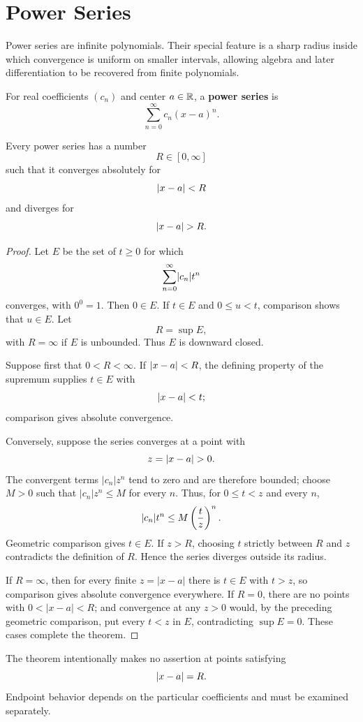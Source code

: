 \section{Power Series}

Power series are infinite polynomials.  Their special feature is a sharp
radius inside which convergence is uniform on smaller intervals, allowing
algebra and later differentiation to be recovered from finite polynomials.

\begin{definition}
For real coefficients $(c_n)$ and center $a\in\mathbb{R}$, a \textbf{power series} is
\[
\sum_{n=0}^{\infty}c_n(x-a)^n.
\]
\end{definition}

\begin{theorem}
\label{thm:radius}
Every power series has a number
\[
R\in[0,\infty]
\]
such that it converges absolutely for
\[
\lvert x-a\rvert<R
\]
and diverges for
\[
\lvert x-a\rvert>R.
\]
\end{theorem}
\begin{proof}
Let $E$ be the set of $t\geq0$ for which
\[
\sum_{n=0}^{\infty}\lvert c_n\rvert t^n
\]
converges, with $0^0=1$. Then $0\in E$. If $t\in E$ and $0\leq u<t$, comparison shows that $u\in E$. Let
\[
R=\sup E,
\]
with $R=\infty$ if $E$ is unbounded. Thus $E$ is downward closed.

Suppose first that $0<R<\infty$. If $\lvert x-a\rvert<R$, the defining property
of the supremum supplies $t\in E$ with
\[
\lvert x-a\rvert<t;
\]
comparison gives absolute convergence.

Conversely, suppose the series converges at a point with
\[
z=\lvert x-a\rvert>0.
\]
The convergent terms $|c_n|z^n$ tend to zero and are therefore bounded;
choose $M>0$ such that $|c_n|z^n\leq M$ for every $n$. Thus, for
$0\leq t<z$ and every $n$,
\[
\lvert c_n\rvert t^n\leq M\left(\frac tz\right)^n.
\]
Geometric comparison gives $t\in E$. If $z>R$, choosing $t$ strictly
between $R$ and $z$ contradicts the definition of $R$. Hence the series
diverges outside its radius.

If $R=\infty$, then for every finite $z=|x-a|$ there is $t\in E$ with
$t>z$, so comparison gives absolute convergence everywhere. If $R=0$,
there are no points with $0<|x-a|<R$; and convergence at any $z>0$ would,
by the preceding geometric comparison, put every $t<z$ in $E$, contradicting
$\sup E=0$. These cases complete the theorem.
\end{proof}

The theorem intentionally makes no assertion at points satisfying
\[
\lvert x-a\rvert=R.
\]
Endpoint behavior depends on the particular coefficients and must be examined separately.

